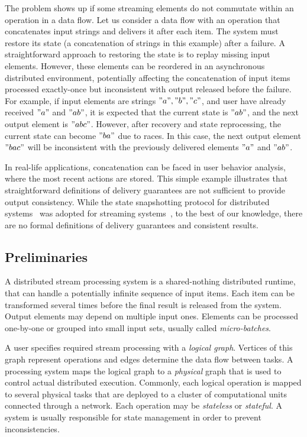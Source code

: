 The problem shows up if some streaming elements do not commutate within an operation in a data flow. 
Let us consider a data flow with an operation that concatenates input strings and delivers it after each item. 
The system must restore its state  (a concatenation of strings in this example) after a failure. 
A straightforward approach to restoring the state is to replay missing input elements. 
However, these elements can be reordered in an asynchronous distributed environment, potentially affecting the concatenation of input items processed exactly-once but inconsistent with output released before the failure. 
For example, if input elements are strings $"a","b","c"$, and user have already received  $"a"$ and $"ab"$, it is expected that the current state is $"ab"$, and the next output element is $"abc"$. However, after recovery and state reprocessing, the current state can become $"ba"$ due to races. In this case, the next output element $"bac"$ will be inconsistent with the previously delivered elements $"a"$ and $"ab"$.  

In real-life applications, concatenation can be faced in user behavior analysis, where the most recent actions are stored. 
This simple example illustrates that straightforward definitions of delivery guarantees are not sufficient to provide output consistency. 
While the state snapshotting protocol for distributed systems~\cite{Chandy:1985:DSD:214451.214456} was adopted for streaming systems~\cite{2015arXiv150608603C}, to the best of our knowledge, there are no formal definitions of delivery guarantees and consistent results.

\subsection{Preliminaries} 

A distributed stream processing system is a shared-nothing distributed runtime, that can handle a potentially infinite sequence of input items. Each item can be transformed several times before the final result is released from the system. Output elements may depend on multiple input ones. Elements can be processed one-by-one or grouped into small input sets, usually called {\em micro-batches}. 

A user specifies required stream processing with a {\em logical graph}. Vertices of this graph represent operations and edges determine the data flow between tasks. A processing system maps the logical graph to a {\em physical} graph that is used to control actual distributed execution. Commonly, each logical operation is mapped to several physical tasks that are deployed to a cluster of computational units connected through a network. Each operation may be {\em stateless} or {\em stateful}. A system is usually responsible for state management in order to prevent inconsistencies.

